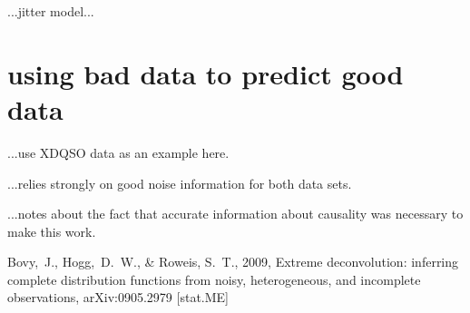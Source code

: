 \documentclass[12pt,twoside]{article}
\begin{document}
...jitter model...

\section{using bad data to predict good data}

...use XDQSO data as an example here.

...relies strongly on good noise information for both data sets.

...notes about the fact that accurate information about causality was
necessary to make this work.

\clearpage
{}\theendnotes

\clearpage
\begin{thebibliography}{}
  Bovy,~J., Hogg,~D.~W., \& Roweis, S.~T., 2009,
  Extreme deconvolution: inferring complete distribution functions from noisy, heterogeneous, and incomplete observations, 
  arXiv:0905.2979 [stat.ME]
\end{thebibliography}
\end{document}
